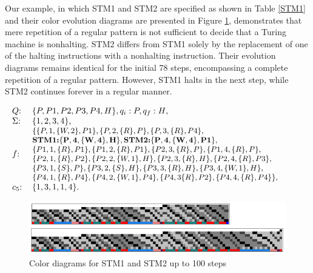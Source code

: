 \documentclass[%
  manuscript=article,   %
  year=2024,
  volume=77,
  doi=00000.000,
]{zfn}
\begin{document}
Our example, in which STM1 and STM2 are specified as shown in Table \ref{STM1} and their color evolution diagrams are presented in Figure \ref{STM12}, demonstrates that mere repetition of a regular pattern is not sufficient to decide that a Turing machine is nonhalting. STM2 differs from STM1 solely by the replacement of one of the halting instructions with a nonhalting instruction. Their evolution diagrams remains identical for the initial 78 steps, encompassing a complete repetition of a regular pattern. However, 
STM1 halts in the next step, while STM2 continues forever in a regular manner.

\begin{table}
\begin{eqnarray}
\hspace{-0.5cm}& \begin{tabular}{ll}
$Q$: & $\{P,P1,P2,P3,P4,H\}, q_{i}: P, q_{f}: H$,\\
$\Sigma$: & $\{1,2,3,4\}$,\\
$f$: & \hspace{-0.2cm}\begin{small}\begin{tabular}{l}$\{\{P,1,\{W,2\}, P1\},\{P,2,\{R\},P\},\{P,3,\{R\},P4\},$\\
${\bf \mbox{\bf STM1:} \{P,4,\{W,4\},H\}, \mbox{\bf STM2:} \{P,4,\{W,4\},P1\}}$,\\
$\{P1,1,\{R\},P1\},\{P1,2,\{R\},P1\},\{P2,3,\{R\},P\},\{P1,4,\{R\},P\},$\\
$\{P2,1,\{R\},P2\},\{P2,2,\{W,1\},H\},\{P2,3,\{R\},H\},\{P2,4,\{R\},P3\}$,\\
$\{P3,1,\{S\},P\}, \{P3,2,\{S\},H\}, \{P3,3,\{R\},H\},\{P3,4,\{W,1\},H\},$\\
$\{P4,1,\{R\},P4\},\{P4,2,\{W,1\},P4\}, \{P4,3\{R\},P2\}, \{P4,4,\{R\},P4\}\},$
\end{tabular}\end{small}\\
$c_{5}$: & $\{1,3,1,1,4\}$.
\end{tabular} & \nonumber 
\end{eqnarray}
\caption{STM1 (halting) and STM2 (not halting), differing by one instruction  \label{STM1}}
\end{table}

\begin{figure}
    \centering
    \includegraphics[width=12.5cm]{ART_Lampert/STM12.png}
\caption{Color diagrams for STM1 and STM2 up to 100 steps}
    \label{STM12}
\end{figure}
\end{document}
